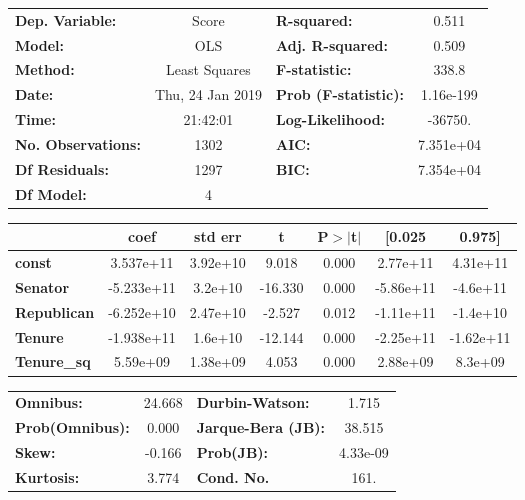 \begin{center}
\begin{tabular}{lclc}
\toprule
\textbf{Dep. Variable:}    &      Score       & \textbf{  R-squared:         } &     0.511   \\
\textbf{Model:}            &       OLS        & \textbf{  Adj. R-squared:    } &     0.509   \\
\textbf{Method:}           &  Least Squares   & \textbf{  F-statistic:       } &     338.8   \\
\textbf{Date:}             & Thu, 24 Jan 2019 & \textbf{  Prob (F-statistic):} & 1.16e-199   \\
\textbf{Time:}             &     21:42:01     & \textbf{  Log-Likelihood:    } &   -36750.   \\
\textbf{No. Observations:} &        1302      & \textbf{  AIC:               } & 7.351e+04   \\
\textbf{Df Residuals:}     &        1297      & \textbf{  BIC:               } & 7.354e+04   \\
\textbf{Df Model:}         &           4      & \textbf{                     } &             \\
\bottomrule
\end{tabular}
\begin{tabular}{lcccccc}
                    & \textbf{coef} & \textbf{std err} & \textbf{t} & \textbf{P$>$$|$t$|$} & \textbf{[0.025} & \textbf{0.975]}  \\
\midrule
\textbf{const}      &    3.537e+11  &     3.92e+10     &     9.018  &         0.000        &     2.77e+11    &     4.31e+11     \\
\textbf{Senator}    &   -5.233e+11  &      3.2e+10     &   -16.330  &         0.000        &    -5.86e+11    &     -4.6e+11     \\
\textbf{Republican} &   -6.252e+10  &     2.47e+10     &    -2.527  &         0.012        &    -1.11e+11    &     -1.4e+10     \\
\textbf{Tenure}     &   -1.938e+11  &      1.6e+10     &   -12.144  &         0.000        &    -2.25e+11    &    -1.62e+11     \\
\textbf{Tenure\_sq} &     5.59e+09  &     1.38e+09     &     4.053  &         0.000        &     2.88e+09    &      8.3e+09     \\
\bottomrule
\end{tabular}
\begin{tabular}{lclc}
\textbf{Omnibus:}       & 24.668 & \textbf{  Durbin-Watson:     } &    1.715  \\
\textbf{Prob(Omnibus):} &  0.000 & \textbf{  Jarque-Bera (JB):  } &   38.515  \\
\textbf{Skew:}          & -0.166 & \textbf{  Prob(JB):          } & 4.33e-09  \\
\textbf{Kurtosis:}      &  3.774 & \textbf{  Cond. No.          } &     161.  \\
\bottomrule
\end{tabular}
\end{center}